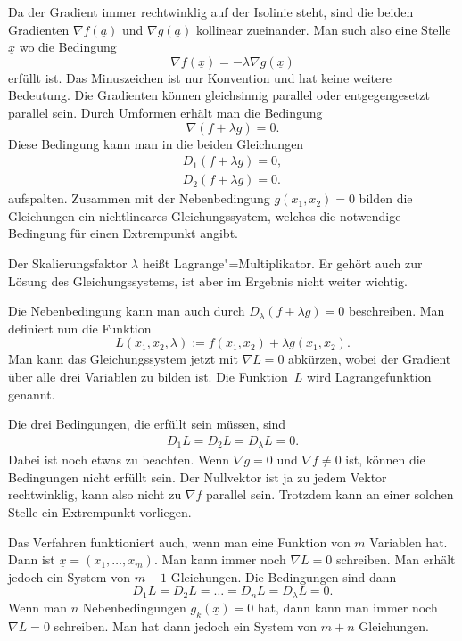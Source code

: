 \documentclass[a4paper,10pt,fleqn,twocolumn,twoside]{article}
\begin{document}
Da der Gradient immer rechtwinklig auf der Isolinie steht, sind die
beiden Gradienten \(\nabla f(\underline a)\) und
\(\nabla g(\underline a)\) kollinear zueinander. Man such also eine
Stelle \(\underline x\) wo die Bedingung
\[\nabla f(\underline x) = -\lambda\nabla g(\underline x)\]
erfüllt ist. Das Minuszeichen ist nur Konvention und hat keine weitere
Bedeutung. Die Gradienten können
gleichsinnig parallel oder entgegengesetzt parallel sein.
Durch Umformen erhält man die Bedingung
\[\nabla (f+\lambda g)=0.\]
Diese Bedingung kann man in die beiden Gleichungen
\begin{gather*}
D_1(f+\lambda g)=0,\\
D_2(f+\lambda g)=0.
\end{gather*}
aufspalten. Zusammen mit der Nebenbedingung \(g(x_1,x_2)=0\) bilden
die Gleichungen ein nichtlineares Gleichungssystem, welches die
notwendige Bedingung für einen Extrempunkt angibt.

Der Skalierungsfaktor \(\lambda\) heißt Lagrange"=Multiplikator.
Er gehört auch zur Lösung des Gleichungssystems, ist aber
im Ergebnis nicht weiter wichtig.

Die Nebenbedingung kann man auch durch
\(D_\lambda (f+\lambda g)=0\) beschreiben.
Man definiert nun die Funktion
\[L(x_1,x_2,\lambda) := f(x_1,x_2)+\lambda g(x_1,x_2).\]
Man kann das Gleichungssystem jetzt mit \(\nabla L=0\)
abkürzen, wobei der Gradient über alle drei Variablen zu bilden ist.
Die Funktion~\(L\) wird Lagrangefunktion genannt.

Die drei Bedingungen, die erfüllt sein müssen, sind
\begin{gather*}
D_1 L = D_2 L = D_\lambda L = 0.
\end{gather*}
Dabei ist noch etwas zu beachten. Wenn \(\nabla g=0\) und
\(\nabla f\ne 0\) ist, können die Bedingungen
nicht erfüllt sein. Der Nullvektor ist ja zu jedem Vektor
rechtwinklig, kann also nicht zu \(\nabla f\) parallel sein.
Trotzdem kann an einer solchen Stelle ein Extrempunkt vorliegen.

Das Verfahren funktioniert auch, wenn man eine Funktion von \(m\)
Variablen hat. Dann ist \(\underline x=(x_1,\ldots,x_m).\)
Man kann immer noch \(\nabla L=0\) schreiben. Man erhält jedoch ein
System von \(m+1\) Gleichungen. Die Bedingungen sind dann
\[D_1 L = D_2 L = \ldots = D_n L = D_\lambda L = 0.\]
%
Wenn man \(n\) Nebenbedingungen \(g_k(\underline x)=0\) hat,
dann kann man immer noch \(\nabla L=0\) schreiben.
Man hat dann jedoch ein System von \(m+n\) Gleichungen.
\end{document}
